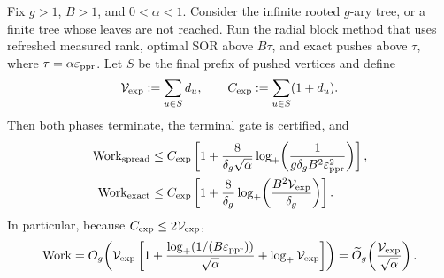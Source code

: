 \begin{theorem}
\label{thm:direct-homogeneous-radial-two-rung}
Fix $g>1$, $B>1$, and $0<\alpha<1$.  Consider the infinite rooted $g$-ary
tree, or a finite tree whose leaves are not reached.  Run the radial block
method that uses refreshed measured rank, optimal SOR above $B\tau$, and
exact pushes above $\tau$, where $\tau=\alpha\varepsilon_{\mathrm{ppr}}$.  Let $S$ be the final
prefix of pushed vertices and define
\begin{equation*}
 \mathcal V_{\rm exp}:=\sum_{u\in S}d_u,
 \qquad
 C_{\rm exp}:=\sum_{u\in S}(1+d_u).
\end{equation*}
Then both phases terminate, the terminal gate is certified, and
\begin{align}
 \operatorname{Work}_{\rm spread}
 &\leq C_{\rm exp}\left[
  1+\frac{8}{\delta_g\sqrt\alpha}
  \log_+\!\left(
   \frac1{g\delta_g B^2\varepsilon_{\mathrm{ppr}}^2}
  \right)\right],
 \label{eq:direct-homogeneous-spread-work}\\
 \operatorname{Work}_{\rm exact}
 &\leq C_{\rm exp}\left[
  1+\frac8{\delta_g}
  \log_+\!\left(
   \frac{B^2\mathcal V_{\rm exp}}{\delta_g}
  \right)\right].
 \label{eq:direct-homogeneous-exact-work}
\end{align}
In particular, because $C_{\rm exp}\leq2\mathcal V_{\rm exp}$,
\begin{equation}
 \operatorname{Work}
 =O_g\!\left(
  \mathcal V_{\rm exp}\left[
   1+\frac{\log_+(1/(B\varepsilon_{\mathrm{ppr}}))}{\sqrt\alpha}
   +\log_+\mathcal V_{\rm exp}
  \right]
 \right)
 =\widetilde O_g\!\left(
  \frac{\mathcal V_{\rm exp}}{\sqrt\alpha}
 \right).
 \label{eq:direct-homogeneous-total-work}
\end{equation}
\end{theorem}

